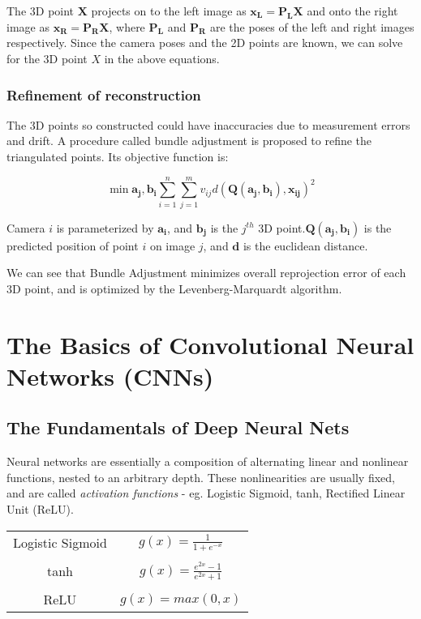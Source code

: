 The 3D point $\mathbf{X}$ projects on to the left image as $\mathbf{x_L} = \mathbf{P_LX}$ and onto the right image as $\mathbf{x_R} = \mathbf{P_RX}$, where $\mathbf{P_L}$ and $\mathbf{P_R}$ are the poses of the left and right images respectively. Since the camera poses and the 2D points are known, we can solve for the 3D point $X$ in the above equations. 

\subsubsection{Refinement of reconstruction}
The 3D points so constructed could have inaccuracies due to measurement errors and drift. A procedure called bundle adjustment is proposed to refine the triangulated points. Its objective function is:

\[\min{\mathbf{a_j,b_i}} \sum_{i=1}^{n} \sum_{j=1}^{m} v_{ij}d(\mathbf{Q(a_j, b_i), x_{ij}})^2\]

Camera $i$ is parameterized by $\mathbf{a_i}$, and $\mathbf{b_j}$ is the $j^{th}$ 3D point.$\mathbf{Q(a_j, b_i)}$ is the predicted position of point $i$ on image $j$, and $\mathbf{d}$ is the euclidean distance.

We can see that Bundle Adjustment minimizes overall reprojection error of each 3D point, and is optimized by the Levenberg-Marquardt algorithm.

\section{The Basics of Convolutional Neural Networks (CNNs)}
\subsection{The Fundamentals of Deep Neural Nets}
Neural networks are essentially a composition of alternating linear and nonlinear functions, nested to an arbitrary depth. These nonlinearities are usually fixed, and are called \emph{activation functions} - eg. Logistic Sigmoid, tanh, Rectified Linear Unit (ReLU). 

\begin{center}
	\begin{tabular}{ |c|c| } 
		\hline
		Logistic Sigmoid & $g(x) = \frac{1}{1 + e^{-x}}$ \\\\
		tanh & $g(x) = \frac{e^{2x} - 1}{e^{2x} + 1}$ \\\\
		ReLU & $g(x)= max(0, x)$ \\ 
		\hline
	\end{tabular}
\end{center}

